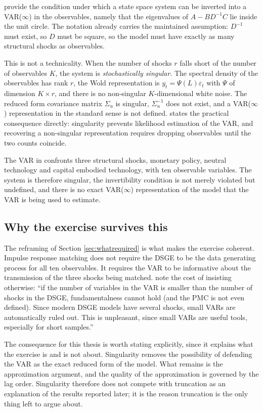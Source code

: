 \citet{FVRRS2005} provide the condition under which a state space system can be inverted into a
VAR($\infty$) in the observables, namely that the eigenvalues of $A - BD^{-1}C$ lie inside the
unit circle. The notation already carries the maintained assumption: $D^{-1}$ must exist, so
$D$ must be square, so the model must have exactly as many structural shocks as observables.

This is not a technicality. When the number of shocks $r$ falls short of the number of
observables $K$, the system is \emph{stochastically singular}. The spectral density of the
observables has rank $r$, the Wold representation is $y_t = \Psi(L)\varepsilon_t$ with $\Psi$
of dimension $K \times r$, and there is no non-singular $K$-dimensional white noise. The
reduced form covariance matrix $\Sigma_u$ is singular, $\Sigma_u^{-1}$ does not exist, and a
VAR($\infty$) representation in the standard sense is not defined. \citet{Ravenna2007} states
the practical consequence directly: singularity prevents likelihood estimation of the VAR, and
recovering a non-singular representation requires dropping observables until the two counts
coincide.

The VAR in \citet{ACEL2011} confronts three structural shocks, monetary policy, neutral
technology and capital embodied technology, with ten observable variables. The system is
therefore singular, the invertibility condition is not merely violated but undefined, and there
is no exact VAR($\infty$) representation of the model that the VAR is being used to estimate.

\subsection{Why the exercise survives this}

The reframing of Section \ref{sec:whatrequired} is what makes the exercise coherent. Impulse
response matching does not require the DSGE to be the data generating process for all ten
observables. It requires the VAR to be informative about the transmission of the three shocks
being matched. \citet{Forni_Gambetti_Sala2016} note the cost of insisting otherwise: ``if the
number of variables in the VAR is smaller than the number of shocks in the DSGE,
fundamentalness cannot hold (and the PMC is not even defined). Since modern DSGE models have
several shocks, small VARs are automatically ruled out. This is unpleasant, since small VARs
are useful tools, especially for short samples.''

The consequence for this thesis is worth stating explicitly, since it explains what the
exercise is and is not about. Singularity removes the possibility of defending the VAR as the
exact reduced form of the model. What remains is the approximation argument, and the quality of
the approximation is governed by the lag order. Singularity therefore does not compete with
truncation as an explanation of the results reported later; it is the reason truncation is the
only thing left to argue about.

